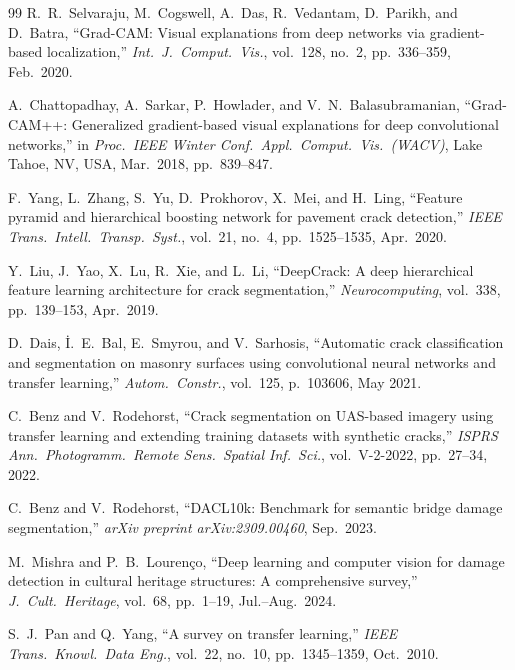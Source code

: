 \documentclass[12pt,a4paper]{article}
\begin{document}
\begin{thebibliography}{99}
R.~R.~Selvaraju, M.~Cogswell, A.~Das, R.~Vedantam, D.~Parikh, and D.~Batra,
``Grad-CAM: Visual explanations from deep networks via gradient-based localization,''
\textit{Int.\ J.\ Comput.\ Vis.},
vol.\ 128, no.\ 2, pp.\ 336--359, Feb.\ 2020.

A.~Chattopadhay, A.~Sarkar, P.~Howlader, and V.~N.~Balasubramanian,
``Grad-CAM++: Generalized gradient-based visual explanations for deep convolutional networks,''
in \textit{Proc.\ IEEE Winter Conf.\ Appl.\ Comput.\ Vis.\ (WACV)},
Lake Tahoe, NV, USA, Mar.\ 2018, pp.\ 839--847.

F.~Yang, L.~Zhang, S.~Yu, D.~Prokhorov, X.~Mei, and H.~Ling,
``Feature pyramid and hierarchical boosting network for pavement crack detection,''
\textit{IEEE Trans.\ Intell.\ Transp.\ Syst.},
vol.\ 21, no.\ 4, pp.\ 1525--1535, Apr.\ 2020.

Y.~Liu, J.~Yao, X.~Lu, R.~Xie, and L.~Li,
``DeepCrack: A deep hierarchical feature learning architecture for crack segmentation,''
\textit{Neurocomputing},
vol.\ 338, pp.\ 139--153, Apr.\ 2019.

D.~Dais, \.{I}.~E.~Bal, E.~Smyrou, and V.~Sarhosis,
``Automatic crack classification and segmentation on masonry surfaces using convolutional neural networks and transfer learning,''
\textit{Autom.\ Constr.},
vol.\ 125, p.\ 103606, May 2021.

C.~Benz and V.~Rodehorst,
``Crack segmentation on UAS-based imagery using transfer learning and extending training datasets with synthetic cracks,''
\textit{ISPRS Ann.\ Photogramm.\ Remote Sens.\ Spatial Inf.\ Sci.},
vol.\ V-2-2022, pp.\ 27--34, 2022.

C.~Benz and V.~Rodehorst,
``DACL10k: Benchmark for semantic bridge damage segmentation,''
\textit{arXiv preprint arXiv:2309.00460}, Sep.\ 2023.

M.~Mishra and P.~B.~Louren\c{c}o,
``Deep learning and computer vision for damage detection in cultural heritage structures: A comprehensive survey,''
\textit{J.\ Cult.\ Heritage},
vol.\ 68, pp.\ 1--19, Jul.--Aug.\ 2024.

S.~J.~Pan and Q.~Yang,
``A survey on transfer learning,''
\textit{IEEE Trans.\ Knowl.\ Data Eng.},
vol.\ 22, no.\ 10, pp.\ 1345--1359, Oct.\ 2010.


\end{thebibliography}
\end{document}
